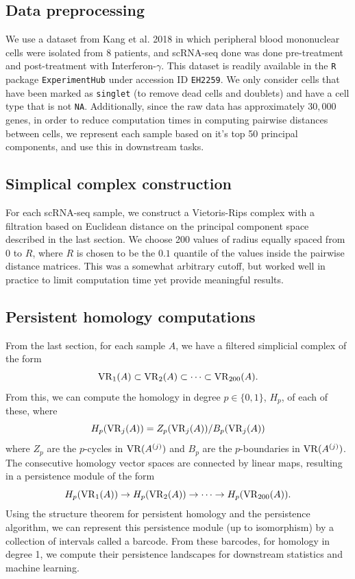 \documentclass[11pt]{article}
\begin{document}
\subsection{Data preprocessing}
We use a dataset from Kang et al. 2018 in which peripheral blood mononuclear cells were isolated from 8 patients, and scRNA-seq done was done pre-treatment and post-treatment with Interferon-$\gamma$. This dataset is readily available in the \texttt{R} package \texttt{ExperimentHub} under accession ID \texttt{EH2259}. We only consider cells that have been marked as \texttt{singlet} (to remove dead cells and doublets) and have a cell type that is not \texttt{NA}. Additionally, since the raw data has approximately $30,000$ genes, in order to reduce computation times in computing pairwise distances between cells, we represent each sample based on it's top 50 principal components, and use this in downstream tasks.

\subsection{Simplical complex construction}
For each scRNA-seq sample, we construct a Vietoris-Rips complex with a filtration based on Euclidean distance on the principal component space described in the last section. We choose 200 values of radius equally spaced from $0$ to $R$, where $R$ is chosen to be the $0.1$ quantile of the values inside the pairwise distance matrices. This was a somewhat arbitrary cutoff, but worked well in practice to limit computation time yet provide meaningful results.

\subsection{Persistent homology computations}
From the last section, for each sample $A$, we have a filtered simplicial complex of the form
$$
{\rm VR}_1(A) \subset {\rm VR}_2(A)	 \subset \cdots \subset {\rm VR}_{200}(A).
$$
From this, we can compute the homology in degree $p \in \lbrace 0, 1 \rbrace$, $H_p$, of each of these, where
$$
H_p({\rm VR}_j(A)) = Z_p({\rm VR}_j(A))/B_p({\rm VR}_j(A))
$$ 
where $Z_p$ are the $p$-cycles in ${\rm VR}(A^{(j)})$ and $B_p$ are the $p$-boundaries in ${\rm VR}(A^{(j)})$. The consecutive homology vector spaces are connected by linear maps, resulting in a persistence module of the form 
$$
H_p({\rm VR}_1(A)) \to H_p({\rm VR}_2(A)) \to \cdots \to H_p({\rm VR}_{200}(A)).
$$
Using the structure theorem for persistent homology and the persistence algorithm, we can represent this persistence module (up to isomorphism) by a collection of intervals called a barcode. From these barcodes, for homology in degree 1, we compute their persistence landscapes for downstream statistics and machine learning.
\end{document}
